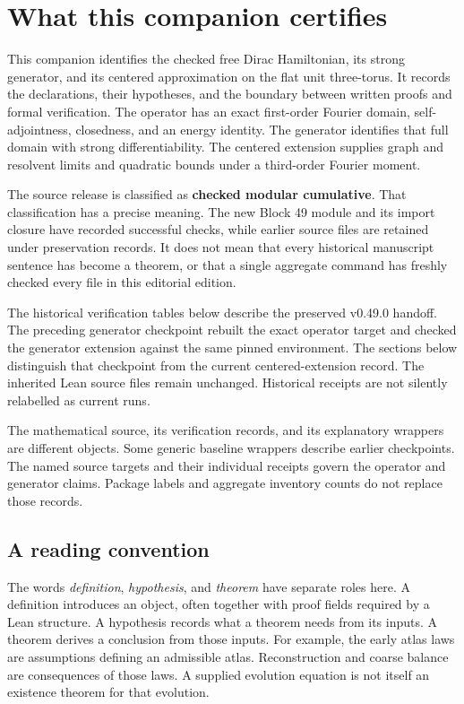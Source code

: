 \section{What this companion certifies}

This companion identifies the checked free Dirac Hamiltonian, its strong generator, and its centered approximation on the flat unit three-torus. It records the declarations, their hypotheses, and the boundary between written proofs and formal verification. The operator has an exact first-order Fourier domain, self-adjointness, closedness, and an energy identity. The generator identifies that full domain with strong differentiability. The centered extension supplies graph and resolvent limits and quadratic bounds under a third-order Fourier moment.

The source release is classified as \textbf{checked modular cumulative}. That classification has a precise meaning. The new Block 49 module and its import closure have recorded successful checks, while earlier source files are retained under preservation records. It does not mean that every historical manuscript sentence has become a theorem, or that a single aggregate command has freshly checked every file in this editorial edition.

The historical verification tables below describe the preserved v0.49.0 handoff. The preceding generator checkpoint rebuilt the exact operator target and checked the generator extension against the same pinned environment. The sections below distinguish that checkpoint from the current centered-extension record. The inherited Lean source files remain unchanged. Historical receipts are not silently relabelled as current runs.

The mathematical source, its verification records, and its explanatory wrappers are different objects. Some generic baseline wrappers describe earlier checkpoints. The named source targets and their individual receipts govern the operator and generator claims. Package labels and aggregate inventory counts do not replace those records.

\subsection{A reading convention}

The words \emph{definition}, \emph{hypothesis}, and \emph{theorem} have separate roles here. A definition introduces an object, often together with proof fields required by a Lean structure. A hypothesis records what a theorem needs from its inputs. A theorem derives a conclusion from those inputs. For example, the early atlas laws are assumptions defining an admissible atlas. Reconstruction and coarse balance are consequences of those laws. A supplied evolution equation is not itself an existence theorem for that evolution.

